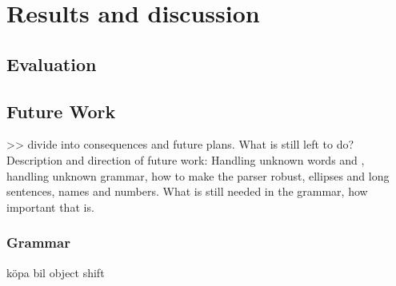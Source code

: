 \documentclass{report}
\begin{document}



\chapter{Results and discussion}
\label{sec:results}
\section{Evaluation}
%
%

\section{Future Work}
\label{sec:future}
>> divide into consequences and future plans.
What is still left to do? Description and direction of future work:
Handling unknown words and , handling unknown grammar, 
how to make the parser robust, ellipses and long sentences, names and numbers.
What is still needed in the grammar, how important that is. 
\subsection{Grammar}
köpa bil 
object shift
\end{document}
